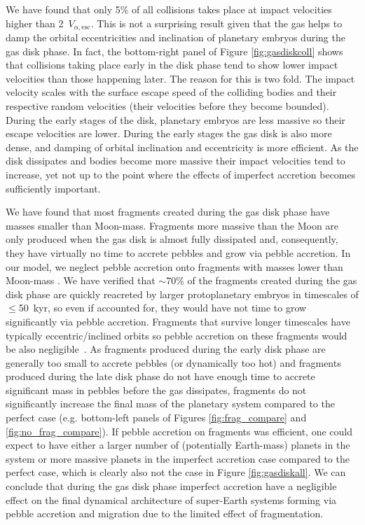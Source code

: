 \documentclass[fleqn,usenatbib]{mnras}
\begin{document}
We have found that only 5\% of all collisions takes place at impact velocities higher than 2~$V_{\alpha,\text{esc}}$. This is not a surprising result given that the gas helps to damp the orbital eccentricities and inclination of planetary embryos during the gas disk phase. In fact, the bottom-right panel of Figure \ref{fig:gasdiskcoll} shows that collisions taking place early in the disk phase tend to show lower impact velocities than those happening later. The reason for this is two fold. The impact velocity scales with the surface escape speed of the colliding bodies and their respective random velocities (their velocities before they become bounded). During the early stages of the disk, planetary embryos are less massive so their escape velocities are lower. During the early stages the gas disk is also more dense, and damping of orbital inclination and eccentricity is more efficient. As the disk dissipates and bodies become more massive their impact velocities tend to increase, yet not up to the point where the effects of imperfect accretion becomes sufficiently important.

We have found that  most fragments created during the gas disk phase have  masses smaller than Moon-mass. Fragments more massive than the Moon are only produced when the gas disk is almost fully dissipated and, consequently, they have virtually no time to accrete pebbles and grow via pebble accretion. In our model, we neglect pebble accretion onto fragments with masses lower than Moon-mass \cite[e.g.][]{johansenlambrechts17}. We have verified that $\sim$70\% of the fragments created during the gas disk phase are quickly reacreted by larger protoplanetary embryos in timescales of  $\leq$50~kyr, so even if accounted for, they would have not time to grow significantly via pebble accretion. Fragments that survive longer timescales have typically eccentric/inclined orbits so pebble accretion on these fragments would be also  negligible~\citep[e.g.][]{levisonetal15,johansenlambrechts17}. As fragments produced during the early disk phase are generally too small to accrete pebbles (or dynamically too hot) and fragments produced during the late disk phase  do not have enough time to accrete significant mass in pebbles before the gas dissipates, fragments do not significantly increase the final mass of the planetary system compared to the perfect case (e.g. bottom-left panels of Figures \ref{fig:frag_compare} and \ref{fig:no_frag_compare}). If pebble accretion on fragments was efficient, one could expect to have either a larger number of (potentially Earth-mass) planets in the system or more massive planets in the imperfect accretion case compared to the perfect case, which is clearly also not the case in Figure \ref{fig:gasdiskall}. We can conclude that during the gas disk phase imperfect accretion have a negligible effect on the final dynamical architecture of super-Earth systems forming via pebble accretion and migration due to the limited effect of fragmentation. 
\end{document}
